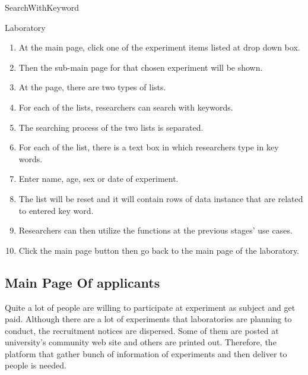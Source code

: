 \documentclass[letterpaper, 10 pt, conference]{ieeeconf}  %
\begin{document}
SearchWithKeyword\\

Laboratory\\

\begin{enumerate}
     \item At the main page, click one of the experiment items listed at drop down box.
    \item Then the sub-main page for that chosen experiment will be shown.
\item At the page, there are two types of lists. 
\item For each of the lists, researchers can search with keywords. 
\item The searching process of the two lists is separated. 
\item For each of the list, there is a text box in which researchers type in key words.
\item Enter name, age, sex or date of experiment. 
\item The list will be reset and it will contain rows of data instance that are related to  entered key word.
\item Researchers can then utilize the functions at the previous stages' use cases. 
\item Click the main page button then go back to the main page of the laboratory.
    
\end{enumerate}

\subsection{Main Page Of applicants}
Quite a lot of people are willing to participate at experiment as subject and get paid. Although there are a lot of experiments that laboratories are planning to conduct, the recruitment notices are dispersed. Some of them are posted at university's community web site and others are printed out. Therefore, the platform that gather bunch of information of experiments and then deliver to people is needed. \\
\end{document}
